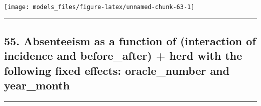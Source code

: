 \documentclass[]{article}
\begin{document}
\begin{center}\texttt{[image: models\_files/figure-latex/unnamed-chunk-63-1]} \end{center}

\newpage

\begin{center}\rule{0.5\linewidth}{\linethickness}\end{center}

\subsection{55. Absenteeism as a function of (interaction of incidence
and before\_after) + herd with the following fixed effects:
oracle\_number and
year\_month}\label{absenteeism-as-a-function-of-interaction-of-incidence-and-before_after-herd-with-the-following-fixed-effects-oracle_number-and-year_month}

\begin{center}\rule{0.5\linewidth}{\linethickness}\end{center}
\end{document}
